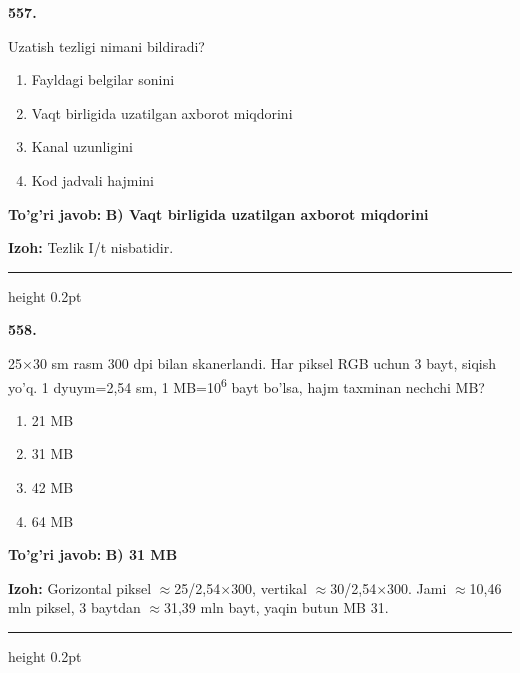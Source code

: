 \documentclass[10pt,a4paper,oneside]{article}
\begin{document}
\noindent\textbf{\color{ink}557.}
\par
Uzatish tezligi nimani bildiradi?
\begin{enumerate}[label=\Alph*),leftmargin=9mm]
\item Fayldagi belgilar sonini
\item Vaqt birligida uzatilgan axborot miqdorini
\item Kanal uzunligini
\item Kod jadvali hajmini
\end{enumerate}
\begin{tcolorbox}[enhanced,breakable,colback=teal!4,colframe=teal!50!black,boxrule=0.5pt,arc=1.1mm,left=3mm,right=3mm,top=1.7mm,bottom=1.7mm,before skip=2mm,after skip=2mm]
\textbf{\color{teal}To'g'ri javob:} \textbf{B) Vaqt birligida uzatilgan axborot miqdorini}
\par\smallskip
\textbf{Izoh:} Tezlik I/t nisbatidir.
\end{tcolorbox}
\vspace{2mm}\hrule height 0.2pt \vspace{3mm}

\noindent\textbf{\color{ink}558.}
\par
25\ensuremath{\times}30 sm rasm 300 dpi bilan skanerlandi. Har piksel RGB uchun 3 bayt, siqish yo'q. 1 dyuym=2,54 sm, 1 MB=10\textsuperscript{6} bayt bo'lsa, hajm taxminan nechchi MB?
\begin{enumerate}[label=\Alph*),leftmargin=9mm]
\item 21 MB
\item 31 MB
\item 42 MB
\item 64 MB
\end{enumerate}
\begin{tcolorbox}[enhanced,breakable,colback=teal!4,colframe=teal!50!black,boxrule=0.5pt,arc=1.1mm,left=3mm,right=3mm,top=1.7mm,bottom=1.7mm,before skip=2mm,after skip=2mm]
\textbf{\color{teal}To'g'ri javob:} \textbf{B) 31 MB}
\par\smallskip
\textbf{Izoh:} Gorizontal piksel \ensuremath{\approx}25/2,54\ensuremath{\times}300, vertikal \ensuremath{\approx}30/2,54\ensuremath{\times}300. Jami \ensuremath{\approx}10,46 mln piksel, 3 baytdan \ensuremath{\approx}31,39 mln bayt, yaqin butun MB 31.
\end{tcolorbox}
\vspace{2mm}\hrule height 0.2pt \vspace{3mm}
\end{document}
